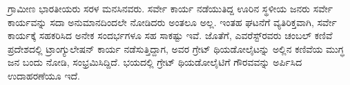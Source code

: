 ಗ್ರಾಮೀಣ ಭಾರತೀಯರು ಸರಳ ಮನಸಿನವರು. ಸರ್ವೇ ಕಾರ್ಯ ನಡೆಯುತಿದ್ದ ಊರಿನ ಸ್ಥಳೀಯ ಜನರು ಸರ್ವೇ ಕಾರ್ಯವನ್ನು ಸದಾ ಅನುಮಾನದಿಂದಲೇ ನೋಡಿದರು ಅಂತಲೂ ಅಲ್ಲ. ಇಂತಹ ಘಟನೆಗೆ ವ್ಯತಿರಿಕ್ತವಾಗಿ, ಸರ್ವೇ ಕಾರ್ಯಕ್ಕೆ ಸಹಕರಿಸಿದ ಅನೇಕ ಸಂದರ್ಭಗಳೂ ಸಹ ಸಾಕಷ್ಟು ಇವೆ. ಜೊತೆಗೆ, ಎವರೆಸ್ಟ್​ರವರು ಚಂಬಲ್​ ಕಣಿವೆ ಪ್ರದೇಶದಲ್ಲಿ ಟ್ರಾಂಗ್ಯುಲೇಷನ್​ ಕಾರ್ಯ ನಡೆಸುತ್ತಿದ್ದಾಗ, ಅವರ ಗ್ರೇಟ್​ ಥಿಯಡೋಲೈಟನ್ನು ಅಲ್ಲಿನ ಕಣಿವೆಯ ಮುಗ್ಧ ಜನ ಬಂದು ನೋಡಿ, ಸಂಭ್ರಮಿಸಿದ್ದಿದೆ. ಭಯದಲ್ಲಿ ಗ್ರೇಟ್​ ಥಿಯಡೋಲೈಟಿಗೆ ಗೌರವವನ್ನು ಅರ್ಪಿಸಿದ ಉದಾಹರಣೆಯೂ ಇದೆ.

